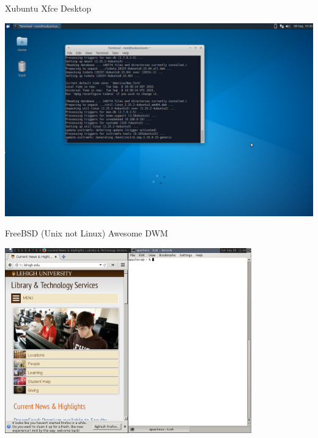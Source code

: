 \documentclass[10pt,t]{beamer}
\begin{document}
\begin{frame}{Xubuntu Xfce Desktop}
  \begin{center}
    \includegraphics[width=\textwidth]{./xubuntu}
  \end{center}
\end{frame}
\begin{frame}{FreeBSD (Unix not Linux) Awesome DWM}
  \begin{center}
    \includegraphics[width=0.8\textwidth]{./freebsd}
  \end{center}
\end{frame}
\end{document}
